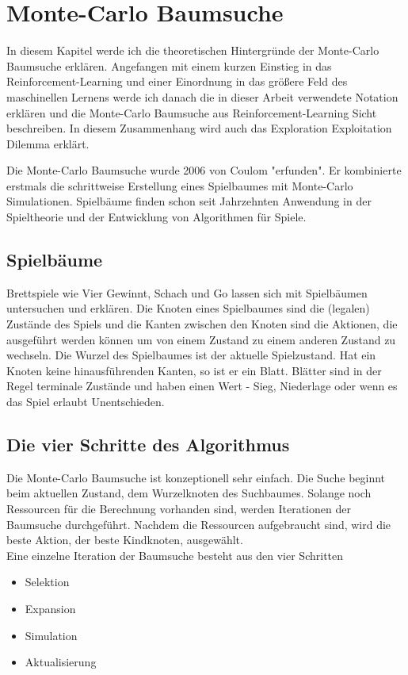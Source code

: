 \section{Monte-Carlo Baumsuche}

In diesem Kapitel werde ich die theoretischen Hintergründe der Monte-Carlo Baumsuche erklären. Angefangen mit einem kurzen Einstieg in das Reinforcement-Learning und einer Einordnung in das größere Feld des maschinellen Lernens werde ich danach die in dieser Arbeit verwendete Notation erklären und die Monte-Carlo Baumsuche aus Reinforcement-Learning Sicht beschreiben. In diesem Zusammenhang wird auch das Exploration Exploitation Dilemma erklärt.

Die Monte-Carlo Baumsuche wurde 2006 von Coulom "erfunden". Er kombinierte erstmals die schrittweise Erstellung eines Spielbaumes mit Monte-Carlo Simulationen. Spielbäume finden schon seit Jahrzehnten Anwendung in der Spieltheorie und der Entwicklung von Algorithmen für Spiele. 

\subsection{Spielbäume}
Brettspiele wie Vier Gewinnt, Schach und Go lassen sich mit Spielbäumen untersuchen und erklären. Die Knoten eines Spielbaumes sind die (legalen) Zustände des Spiels und die Kanten zwischen den Knoten sind die Aktionen, die ausgeführt werden können um von einem Zustand zu einem anderen Zustand zu wechseln. Die Wurzel des Spielbaumes ist der aktuelle Spielzustand. Hat ein Knoten keine hinausführenden Kanten, so ist er ein Blatt. Blätter sind in der Regel terminale Zustände und haben einen Wert - Sieg, Niederlage oder wenn es das Spiel erlaubt Unentschieden.

\subsection{Die vier Schritte des Algorithmus}
Die Monte-Carlo Baumsuche ist konzeptionell sehr einfach. Die Suche beginnt beim aktuellen Zustand, dem Wurzelknoten des Suchbaumes. Solange noch Ressourcen für die Berechnung vorhanden sind, werden Iterationen der Baumsuche durchgeführt. Nachdem die Ressourcen aufgebraucht sind, wird die beste Aktion, der beste Kindknoten, ausgewählt.\\
Eine einzelne Iteration der Baumsuche besteht aus den vier Schritten
\begin{itemize}
	\item Selektion
	\item Expansion
	\item Simulation
	\item Aktualisierung
\end{itemize}

